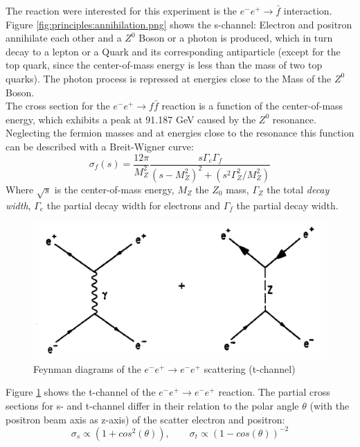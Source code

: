 The reaction were interested for this experiment is the $e^-e^+\rightarrow\bar{f}$ interaction. Figure \ref{fig:principles:annihilation.png} shows the s-channel: Electron and positron annihilate each other and a $Z^0$ Boson or a photon is produced, which in turn decay to a lepton or a Quark and its corresponding antiparticle (except for the top quark, since the center-of-mass energy is less than the mass of two top quarks). The photon process is repressed at energies close to the Mass of the $Z^0$ Boson\cite{muenchen}.\\%
The cross section for the $e^-e^+\rightarrow f\bar{f}$ reaction is a function of the center-of-mass energy, which exhibits a peak at 91.187 GeV caused by the $Z^0$ resonance. Neglecting the fermion masses and at energies close to the resonance this function can be described with a Breit-Wigner curve\cite{staatsex}:
\begin{equation}
\sigma_f(s) = \frac{12\pi}{M_Z^2} \frac{s\Gamma_e\Gamma_f}{(s-M_Z^2)^2+(s^2\Gamma_Z^2/M_Z^2)}
\label{eq:principles:breitwigner}
\end{equation}
Where $\sqrt{s}$ is the center-of-mass energy, $M_Z$ the $Z_0$ mass, $\Gamma_Z$ the total \emph{decay width}, $\Gamma_e$ the partial decay width for electrons and $\Gamma_f$ the partial decay width.
\begin{figure}[H]
	\centering
	\includegraphics{graphics/BhabbaStreuung.png}
	\caption{Feynman diagrams of the $e^-e^+ \rightarrow e^-e^+$ scattering (t-channel)}
	\label{fig:principles:BhabbaStreuung.png}
\end{figure}
Figure \ref{fig:principles:BhabbaStreuung.png} shows the t-channel of the  $e^-e^+ \rightarrow e^-e^+$ reaction. The partial cross sections for s- and t-channel differ in their relation to the polar angle $\theta$ (with the positron beam axis as z-axis) of the scatter electron and positron\cite{anleitung}:
\begin{equation}
\sigma_s \propto (1+cos^2(\theta)),\qquad\sigma_t \propto (1-cos(\theta))^{-2}
\label{eq:principles:s-t-channel}
\end{equation}
